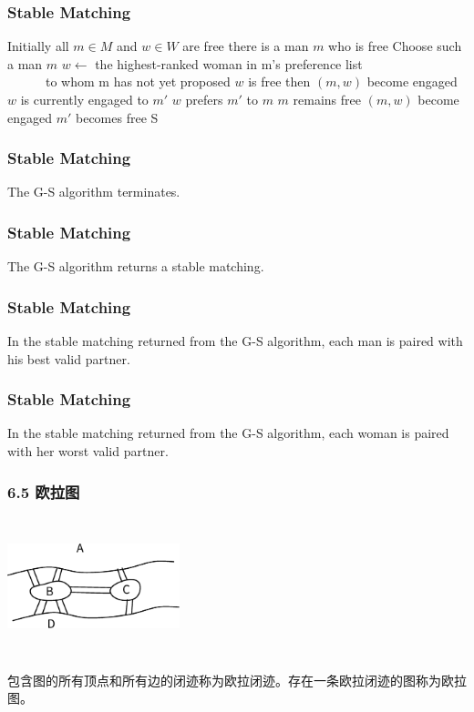 \documentclass{beamer}
\begin{document}
\begin{CJK}{UTF8}{gbsn}
  \begin{frame}
    \frametitle{Stable Matching}
      \begin{codebox}
    \zi Initially all $m \in M$ and $w \in W$ are free
    \zi \While there is a man $m$ who is free
    \zi \Do
           Choose such a man $m$
    \zi       $w \gets $ the highest-ranked woman in m's preference list \\   $\quad\quad\quad$to whom m has not yet proposed
    \zi \If $w$ is free then
    \zi \Then $(m,w)$ become engaged
    \zi \Else
    \zi $w$ is currently engaged to $m'$
    \zi \If $w$ prefers $m'$ to $m$ 
    \zi \Then $m$ remains free
    \zi \Else
    \zi $(m,w)$ become engaged
    \zi $m'$ becomes free
    \End
     \End
    \End
    \zi \Return S 
  \end{codebox}
\end{frame}
\begin{frame}
  \frametitle{Stable Matching}
  \begin{Thm1}
    The G-S algorithm terminates.
  \end{Thm1}
\end{frame}

\begin{frame}
  \frametitle{Stable Matching}
  \begin{Thm2}
    The G-S algorithm returns a stable matching.
  \end{Thm2}
\end{frame}

\begin{frame}
  \frametitle{Stable Matching}
  \begin{Thm3}
    In the stable matching returned from the G-S algorithm, each man is paired with his best valid partner.
  \end{Thm3}
\end{frame}

\begin{frame}
  \frametitle{Stable Matching}
  \begin{Thm4}
    In the stable matching returned from the G-S algorithm, each woman is paired with her worst valid partner.
  \end{Thm4}
\end{frame}


\begin{frame}
  \frametitle{6.5 欧拉图}
\centering
\includegraphics[width=5cm,height=4cm]{konigsberg} 
    \pause
  \begin{definition6.5.1}
    包含图的所有顶点和所有边的闭迹称为\alert{欧拉闭迹}。存在一条欧拉闭迹的图称为\alert{欧拉图}。
  \end{definition6.5.1}


\end{frame}
\end{CJK}
\end{document}
